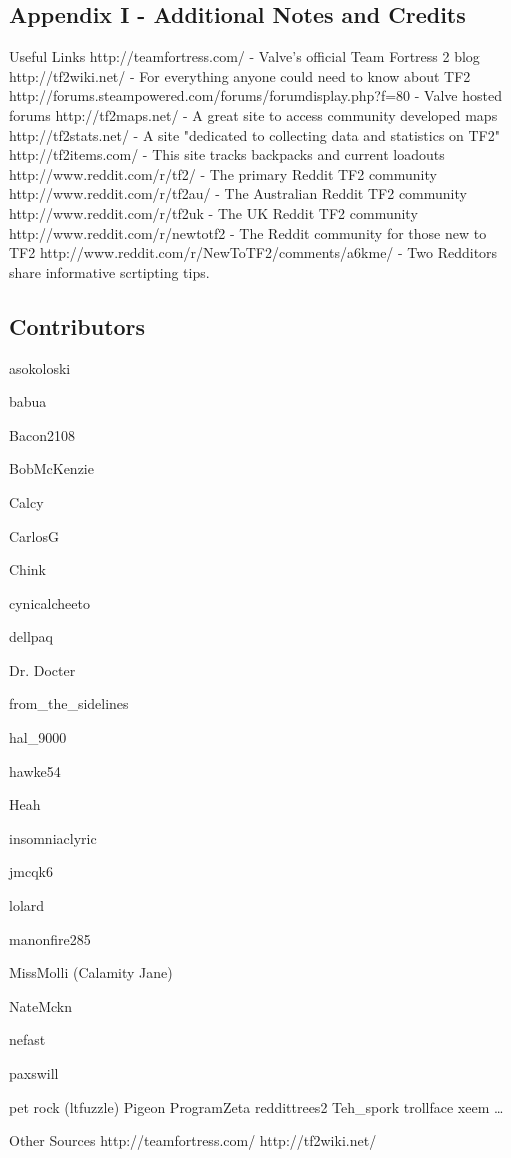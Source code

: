 \subsection{Appendix I - Additional Notes and Credits}
 
Useful Links
http://teamfortress.com/ - Valve's official Team Fortress 2 blog
http://tf2wiki.net/ - For everything anyone could need to know about TF2
http://forums.steampowered.com/forums/forumdisplay.php?f=80 - Valve hosted forums 
http://tf2maps.net/ - A great site to access community developed maps
http://tf2stats.net/ - A site "dedicated to collecting data and statistics on TF2"
http://tf2items.com/ - This site tracks backpacks and current loadouts
http://www.reddit.com/r/tf2/ - The primary Reddit TF2 community
http://www.reddit.com/r/tf2au/ - The Australian Reddit TF2 community
http://www.reddit.com/r/tf2uk - The UK Reddit TF2 community
http://www.reddit.com/r/newtotf2 - The Reddit community for those new to TF2
http://www.reddit.com/r/NewToTF2/comments/a6kme/ - Two Redditors share informative scrtipting tips.

\subsection{Contributors}

\begin{multicols}{3}
	asokoloski

	babua

	Bacon2108

	BobMcKenzie

	Calcy

	CarlosG

	Chink

	cynicalcheeto

	dellpaq

	Dr. Docter

	from\_the\_sidelines

	hal\_9000

	hawke54

	Heah

	insomniaclyric

	jmcqk6

	lolard

	manonfire285

	MissMolli (Calamity Jane)

	NateMckn

	nefast

	paxswill
	
pet rock (ltfuzzle)
Pigeon
ProgramZeta
reddittrees2
Teh\_spork
trollface
xeem
  \ldots
\end{multicols}
 
Other Sources
http://teamfortress.com/
http://tf2wiki.net/